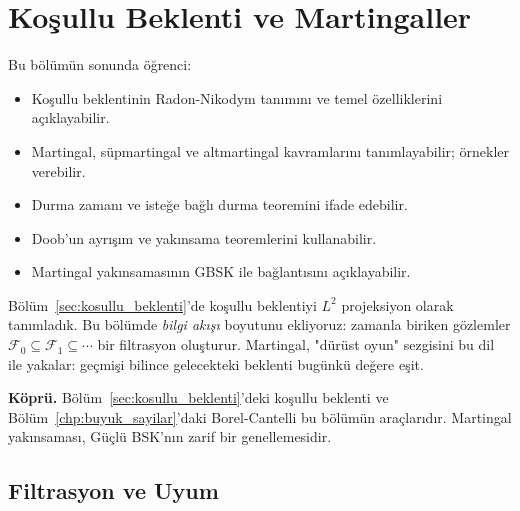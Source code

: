 \chapter{Koşullu Beklenti ve Martingaller}
\label{chp:martingaller}


\begin{kazanimlar}
Bu bölümün sonunda öğrenci:
\begin{itemize}
  \item Koşullu beklentinin Radon-Nikodym tanımını ve temel özelliklerini açıklayabilir.
  \item Martingal, süpmartingal ve altmartingal kavramlarını tanımlayabilir; örnekler verebilir.
  \item Durma zamanı ve isteğe bağlı durma teoremini ifade edebilir.
  \item Doob'un ayrışım ve yakınsama teoremlerini kullanabilir.
  \item Martingal yakınsamasının GBSK ile bağlantısını açıklayabilir.
\end{itemize}
\end{kazanimlar}

\begin{motivasyon}
Bölüm~\ref{sec:kosullu_beklenti}'de koşullu beklentiyi $L^2$ projeksiyon olarak tanımladık.
Bu bölümde \emph{bilgi akışı} boyutunu ekliyoruz: zamanla biriken gözlemler $\mathcal{F}_0 \subseteq \mathcal{F}_1 \subseteq \cdots$
bir filtrasyon oluşturur. Martingal, "dürüst oyun" sezgisini bu dil ile yakalar:
geçmişi bilince gelecekteki beklenti bugünkü değere eşit.

\medskip
\textbf{Köprü.} Bölüm~\ref{sec:kosullu_beklenti}'deki koşullu beklenti ve
Bölüm~\ref{chp:buyuk_sayilar}'daki Borel-Cantelli bu bölümün araçlarıdır.
Martingal yakınsaması, Güçlü BSK'nın zarif bir genellemesidir.
\end{motivasyon}

\section{Filtrasyon ve Uyum}
\label{sec:filtrasyon}

